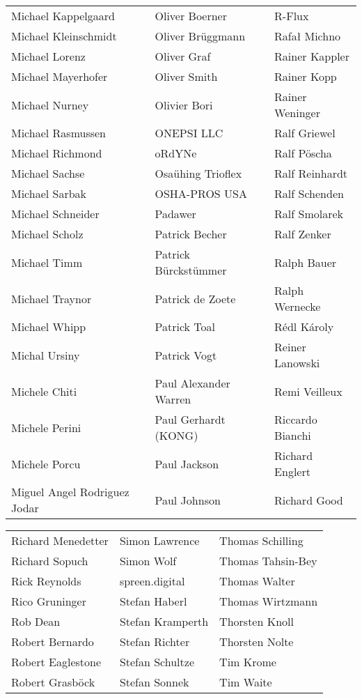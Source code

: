 \begin{small}
\begin{tabular}{p{4cm}p{4cm}p{4cm}}
Michael Kappelgaard & Oliver Boerner & R-Flux \\
Michael Kleinschmidt & Oliver Brüggmann & Rafał Michno \\
Michael Lorenz & Oliver Graf & Rainer Kappler \\
Michael Mayerhofer & Oliver Smith & Rainer Kopp \\
Michael Nurney & Olivier Bori & Rainer Weninger \\
Michael Rasmussen & ONEPSI LLC & Ralf Griewel \\
Michael Richmond & oRdYNe & Ralf Pöscha \\
Michael Sachse & Osaühing Trioflex & Ralf Reinhardt \\
Michael Sarbak & OSHA-PROS USA & Ralf Schenden \\
Michael Schneider & Padawer & Ralf Smolarek \\
Michael Scholz & Patrick Becher & Ralf Zenker \\
Michael Timm & Patrick Bürckstümmer & Ralph Bauer \\
Michael Traynor & Patrick de Zoete & Ralph Wernecke \\
Michael Whipp & Patrick Toal & Rédl Károly \\
Michal Ursiny & Patrick Vogt & Reiner Lanowski \\
Michele Chiti & Paul Alexander Warren & Remi Veilleux \\
Michele Perini & Paul Gerhardt (KONG) & Riccardo Bianchi \\
Michele Porcu & Paul Jackson & Richard Englert \\
Miguel Angel Rodriguez Jodar & Paul Johnson & Richard Good \\
\end{tabular}
\newpage
\setlength{\tabcolsep}{1mm}
\begin{tabular}{p{4cm}p{4cm}p{4cm}}
Richard Menedetter & Simon Lawrence & Thomas Schilling \\
Richard Sopuch & Simon Wolf & Thomas Tahsin-Bey \\
Rick Reynolds & spreen.digital & Thomas Walter \\
Rico Gruninger & Stefan Haberl & Thomas Wirtzmann \\
Rob Dean & Stefan Kramperth & Thorsten Knoll \\
Robert Bernardo & Stefan Richter & Thorsten Nolte \\
Robert Eaglestone & Stefan Schultze & Tim Krome \\
Robert Grasböck & Stefan Sonnek & Tim Waite \\

\end{tabular}
\end{small}
